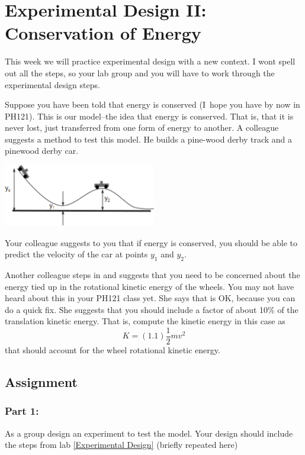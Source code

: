 \documentclass[twoside,11pt,ShortChapTitles]{BYUTextbook}
\begin{document}
\chapter{Experimental Design II: Conservation of Energy}

This week we will practice experimental design with a new context. I wont
spell out all the steps, so your lab group and you will have to work through
the experimental design steps.

Suppose you have been told that energy is conserved (I\ hope you have by now
in PH121). This is our model--the idea that energy is conserved. That is,
that it is never lost, just transferred from one form of energy to another.
A colleague suggests a method to test this model. He builds a pine-wood
derby track and a pinewood derby car.
\begin{center}
\includegraphics[width=0.5\textwidth]{Lab5_figs/LHDZMM03.png}
\end{center}
Your colleague suggests to you
that if energy is conserved, you should be able to predict the velocity of
the car at points $y_{1}$ and $y_{2}.$

Another colleague steps in and suggests that you need to be concerned about
the energy tied up in the rotational kinetic energy of the wheels. You may
not have heard about this in your PH121 class yet. She says that is OK,
because you can do a quick fix. She suggests that you should include a
factor of about 10\% of the translation kinetic energy. That is, compute the
kinetic energy in this case as%
\[
K=\left( 1.1\right) \frac{1}{2}mv^{2} 
\]%
that should account for the wheel rotational kinetic energy.

\pagebreak

\section{Assignment}

\subsection{Part 1:}

As a group design an experiment to test the model. Your design should
include the steps from lab \ref{Experimental Design} (briefly repeated here)
\end{document}

